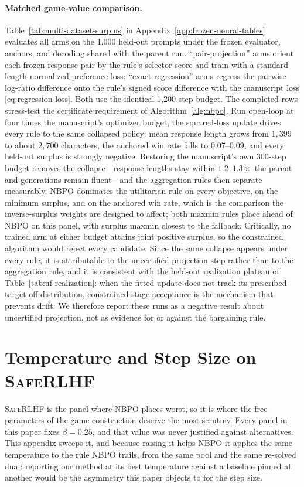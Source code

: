 \documentclass{article}
\theoremstyle{remark}
\theoremstyle{plain}
\newcommand{\NBPO}{\textsc{NBPO}}
\begin{document}
\paragraph{Matched game-value comparison.}
Table~\ref{tab:multi-dataset-surplus} in Appendix~\ref{app:frozen-neural-tables} evaluates all arms on the 1{,}000 held-out prompts under the frozen evaluator, anchors, and decoding shared with the parent run. ``pair-projection'' arms orient each frozen response pair by the rule's selector score and train with a standard length-normalized preference loss; ``exact regression'' arms regress the pairwise log-ratio difference onto the rule's signed score difference with the manuscript loss \eqref{eq:regression-loss}. Both use the identical 1{,}200-step budget.
The completed rows stress-test the certificate requirement of Algorithm~\ref{alg:nbpo}. Run open-loop at four times the manuscript's optimizer budget, the squared-loss update drives every rule to the same collapsed policy: mean response length grows from $1{,}399$ to about $2{,}700$ characters, the anchored win rate falls to $0.07$--$0.09$, and every held-out surplus is strongly negative. Restoring the manuscript's own 300-step budget removes the collapse---response lengths stay within $1.2$--$1.3\times$ the parent and generations remain fluent---and the aggregation rules then separate measurably. \NBPO{} dominates the utilitarian rule on every objective, on the minimum surplus, and on the anchored win rate, which is the comparison the inverse-surplus weights are designed to affect; both maxmin rules place ahead of \NBPO{} on this panel, with surplus maxmin closest to the fallback. Critically, no trained arm at either budget attains joint positive surplus, so the constrained algorithm would reject every candidate. Since the same collapse appears under every rule, it is attributable to the uncertified projection step rather than to the aggregation rule, and it is consistent with the held-out realization plateau of Table~\ref{tab:uf-realization}: when the fitted update does not track its prescribed target off-distribution, constrained stage acceptance is the mechanism that prevents drift. We therefore report these runs as a negative result about uncertified projection, not as evidence for or against the bargaining rule.



\section{Temperature and Step Size on \textsc{SafeRLHF}}
\label{app:beta-saferlhf}
\textsc{SafeRLHF} is the panel where \NBPO{} places worst, so it is where the free parameters of the game
construction deserve the most scrutiny. Every panel in this paper fixes $\beta=0.25$, and that value was
never justified against alternatives. This appendix sweeps it, and because raising it helps \NBPO{} it
applies the same temperature to the rule \NBPO{} trails, from the same pool and the same re-solved dual:
reporting our method at its best temperature against a baseline pinned at another would be the asymmetry
this paper objects to for the step size.
\end{document}
